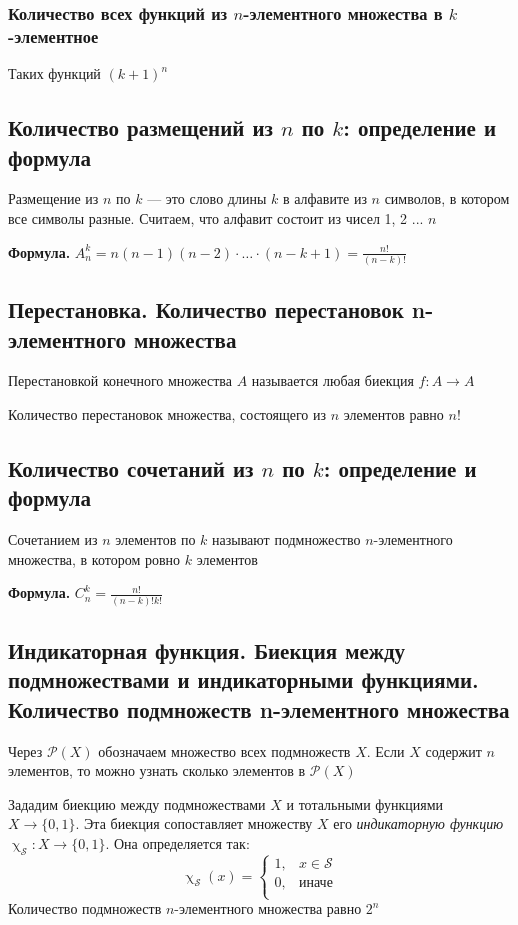 \documentclass[a4paper]{article}
\begin{document}
\subsubsection*{Количество всех функций из $n$-элементного множества в $k$-элементное}
Таких функций $(k+1)^n$

\subsection{Количество размещений из $n$ по $k$: определение и формула}
 Размещение из $n$ по $k$ — это слово длины $k$ в алфавите из $n$ символов, в котором все символы разные. Считаем, что алфавит состоит из чисел 1, 2 ... $n$

\textbf{Формула.} $A^k_n=n(n-1)(n-2)\cdot\ldots\cdot(n-k+1)=\frac{n!}{(n-k)!}$

\subsection{Перестановка. Количество перестановок n-элементного множества}
 Перестановкой конечного множества $A$ называется любая биекция $f: A\rightarrow A$

Количество перестановок множества, состоящего из $n$ элементов равно $n!$

\subsection{Количество сочетаний из $n$ по $k$: определение и формула}
 Сочетанием из $n$ элементов по $k$ называют подмножество $n$-элементного множества, в котором ровно $k$ элементов

\textbf{Формула.} $C^k_n=\frac{n!}{(n-k)!k!}$

\subsection{Индикаторная функция. Биекция между подмножествами и индикаторными функциями. Количество подмножеств n-элементного множества}
\label{sec:1.35} Через $\mathcal{P}(X)$ обозначаем множество всех подмножеств $X$. Если $X$ содержит $n$ элементов, то можно узнать сколько элементов в $\mathcal{P}(X)$

 Зададим биекцию между подмножествами $X$ и тотальными функциями $X\rightarrow\{0,1\}$. Эта биекция сопоставляет множеству $X$ его \textit{индикаторную функцию} $\upchi_{\mathcal{S}}: X\rightarrow\{0,1\}$. Она определяется так:
\begin{equation*}
    \upchi_{\mathcal{S}}(x)=\begin{cases}
    1,&x\in\mathcal{S}\\
    0,&\text{иначе}\\
    \end{cases}
\end{equation*}
Количество подмножеств $n$-элементного множества равно $2^n$
\end{document}
